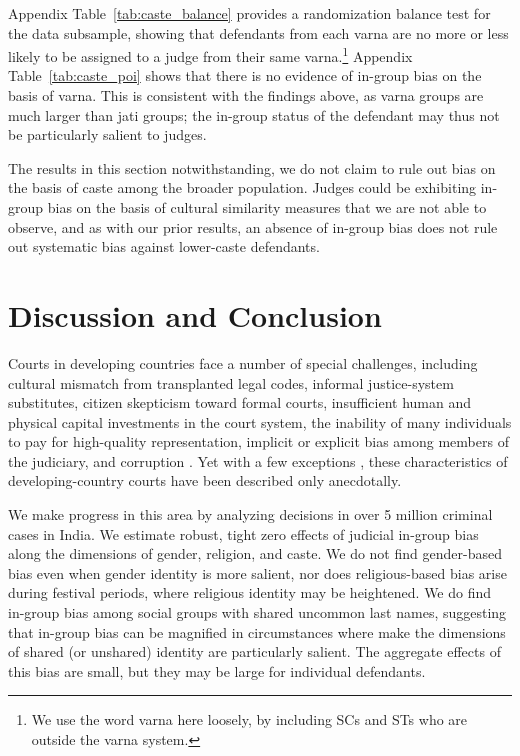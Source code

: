 \documentclass[12pt,english]{article}
\begin{document}
Appendix Table~\ref{tab:caste_balance} provides a randomization balance test for the data subsample, showing that defendants from each varna are no more or less likely to be assigned to a judge from their same varna.\footnote{We use the word varna here loosely, by including SCs and STs who are outside the varna system.} Appendix Table~\ref{tab:caste_poi} shows that there is no evidence of in-group bias on the basis of varna. This is consistent with the findings above, as varna groups are much larger than jati groups; the in-group status of the defendant may thus not be particularly salient to judges.

The results in this section notwithstanding, we do not claim to rule out bias on the basis of caste among the broader population. Judges could be exhibiting in-group bias on the basis of cultural similarity measures that we are not able to observe, and as with our prior results, an absence of in-group bias does not rule out systematic bias against lower-caste defendants.

\section{Discussion and Conclusion}
\label{sec:conc}

Courts in developing countries face a number of special challenges, including cultural mismatch from transplanted legal codes, informal justice-system substitutes, citizen skepticism toward formal courts, insufficient human and physical capital investments in the court system, the inability of many individuals to pay for high-quality representation, implicit or explicit bias among members of the judiciary, and corruption \citep{DjankovLaPortaLopez-de-SilanesShleifer2003QJoE,LaPortaLopez-de-SilanesShleifer2008JoEL}. Yet with a few exceptions \citep[for example]{PonticelliAlencar2016TQJoE}, these characteristics of developing-country courts have been described only anecdotally. 

We make progress in this area by analyzing decisions in over 5 million criminal cases in India. We estimate robust, tight zero effects of judicial in-group bias along the dimensions of gender, religion, and caste. We do not find gender-based bias even when gender identity is more salient, nor does religious-based bias arise during festival periods, where religious identity may be heightened. We do find in-group bias among social groups with shared uncommon last names, suggesting that in-group bias can be magnified in circumstances where make the dimensions of shared (or unshared) identity are particularly salient. The aggregate effects of this bias are small, but they may be large for individual defendants.
\end{document}

